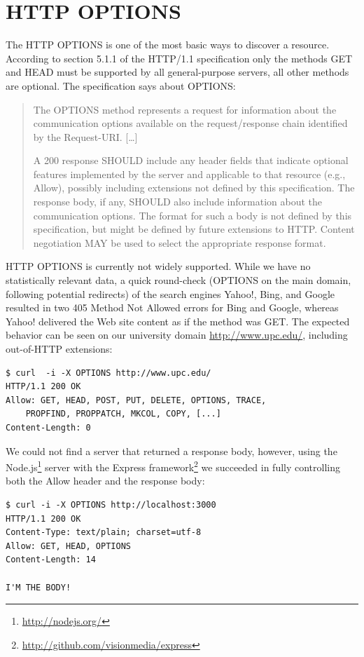 \documentclass{acm_proc_article-sp}
\begin{document}
\section{HTTP OPTIONS}\label{sec:httpoptions}
The HTTP OPTIONS is one of the most basic ways to discover a resource. According to section 5.1.1 of the HTTP/1.1 specification\cite{HTTP:Spec} only the methods GET and HEAD must be supported by all general-purpose servers, all other methods are optional. The specification says about OPTIONS:
\begin{quote}
The OPTIONS method represents a request for information about the communication options available on the request/response chain identified by the Request-URI. [\ldots]

A 200 response SHOULD include any header fields that indicate optional features implemented by the server and applicable to that resource (e.g., Allow), possibly including extensions not defined by this specification. The response body, if any, SHOULD also include information about the communication options. The format for such a body is not defined by this specification, but might be defined by future extensions to HTTP. Content negotiation MAY be used to select the appropriate response format.
\end{quote}
HTTP OPTIONS is currently not widely supported. While we have no statistically relevant data, a quick round-check (OPTIONS on the main domain, following potential redirects) of the search engines Yahoo!, Bing, and Google resulted in two 405 Method Not Allowed errors for Bing and Google, whereas Yahoo! delivered the Web site content as if the method was GET. The expected behavior can be seen on our university domain \url{http://www.upc.edu/}, including out-of-HTTP extensions:
\begin{verbatim}
$ curl  -i -X OPTIONS http://www.upc.edu/
HTTP/1.1 200 OK
Allow: GET, HEAD, POST, PUT, DELETE, OPTIONS, TRACE,
    PROPFIND, PROPPATCH, MKCOL, COPY, [...]
Content-Length: 0
\end{verbatim}
We could not find a server that returned a response body, however, using the Node.js\footnote{\url{http://nodejs.org/}} server with the Express framework\footnote{\url{http://github.com/visionmedia/express}} we succeeded in fully controlling both the Allow header and the response body:
\begin{verbatim}
$ curl -i -X OPTIONS http://localhost:3000
HTTP/1.1 200 OK
Content-Type: text/plain; charset=utf-8
Allow: GET, HEAD, OPTIONS
Content-Length: 14

I'M THE BODY!
\end{verbatim}
\end{document}
